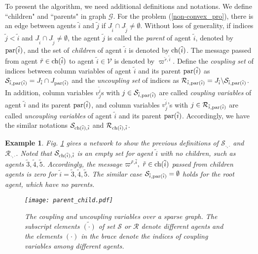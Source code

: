 \documentclass[journal]{IEEEtran}
\newtheorem{example}{Example}[section]
\begin{document}
To present the algorithm, we need additional definitions and notations. We define ``children" and ``parents" in graph $\mathcal G$. For the problem (\ref{non-convex_pro}), there is an edge between agents $\tilde{i}$ and $\tilde{j}$ if $J_{\tilde{i}}\cap J_{\tilde{j}} \neq \emptyset$. Without loss of generality,  if indices $\tilde{j}<\tilde{i}$ and $J_{\tilde{i}}\cap J_{\tilde{j}} \neq \emptyset$, the agent $\tilde{j}$ is called the {\em parent} of agent $\tilde{i}$, denoted by ${\rm par}(\tilde{i})$, and the set of {\em children} of agent $\tilde{i}$ is denoted by ${\rm ch}(\tilde{i})$. The message passed from agent $\tilde{r}\in {\rm ch}(\tilde{i})$ to agent $\tilde{i} \in\mathcal V$ is denoted by $\varpi^{\tilde{r},\tilde{i}}$. Define the {\em coupling set} of indices between column variables of agent $\tilde{i}$ and its parent ${\rm par}(\tilde{i})$ as $\mathcal{S}_{\tilde{i},{\rm par}(\tilde{i})}={{J}_{\tilde{i}}}\cap J_{{\rm par}(\tilde{i})}$ and the {\em uncoupling set} of indices as $\mathcal{R}_{\tilde{i},{\rm par}(\tilde{i})}=J_{\tilde{i}}\backslash \mathcal{S}_{\tilde{i},{\rm par}(\tilde{i})}$. In addition,  column variables $v_j^{\tilde{i}}$s with $j\in \mathcal{S}_{\tilde{i},{\rm par}(\tilde{i})}$ are called {\em coupling variables} of agent $\tilde{i}$ and its parent ${\rm par}(\tilde{i})$, and  column variables $v_j^{\tilde{i}}$'s with $j\in \mathcal{R}_{\tilde{i},{\rm par}(\tilde{i})}$ are called {\em uncoupling variables} of agent $\tilde{i}$ and its parent ${\rm par}(\tilde{i})$. Accordingly, we have the similar notations $\mathcal{S}_{{\rm ch}(\tilde{i}),\tilde{i}}$ and $\mathcal{R}_{{\rm ch}(\tilde{i}),\tilde{i}}$.

\begin{example}%
	Fig. \ref{parent_child_graph} gives  a network  to show the previous definitions of $\mathcal{S}_{\cdot,\cdot}$ and $\mathcal{R}_{\cdot,\cdot}$. Noted that $\mathcal{S}_{{\rm ch}(\tilde{i}),\tilde{i}}$ is an empty set for agent $\tilde{i}$ with no children, such as agents $\tilde{3},\tilde{4},\tilde{5}$. Accordingly, the message $\varpi^{\tilde{r},\tilde{i}}, \ \tilde{r}\in {\rm ch}(\tilde{i})$ passed from children agents is zero for $\tilde{i}=\tilde{3},\tilde{4},\tilde{5}$. The similar case $\mathcal{S}_{\tilde{i},{\rm par}(\tilde{i})}=\emptyset$ holds for the root agent, which have no parents. %
	\begin{figure}[h]
		\centering
		\texttt{[image: parent\_child.pdf]}\\
		\caption{The coupling and uncoupling variables over a sparse graph. The  subscript elements $\tilde{(\cdot)}$ of set $\mathcal{S}$ or $\mathcal{R}$ denote different agents and the elements $(\cdot)$ in the brace denote the indices of coupling variables among different agents. } \label{parent_child_graph}
		\centering
	\end{figure}
\end{example}
\end{document}
